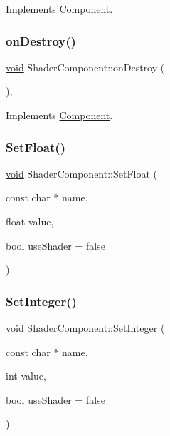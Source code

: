 Implements \hyperlink{classComponent_a3a1537a8b8bcdb2155afbb925c77b0a2}{Component}.

\mbox{\label{classShaderComponent_a7ebd7c8ee1b2aea5ad2010a4652bb588}} 
\subsubsection{\texorpdfstring{on\+Destroy()}{onDestroy()}}
{\footnotesize\ttfamily \hyperlink{imgui__impl__opengl3__loader_8h_ac668e7cffd9e2e9cfee428b9b2f34fa7}{void} Shader\+Component\+::on\+Destroy (\begin{DoxyParamCaption}{ }\end{DoxyParamCaption})\hspace{0.3cm}{\ttfamily [inline]}, {\ttfamily [virtual]}}



Implements \hyperlink{classComponent_a2b198f27162a6caf63917e304295f892}{Component}.

\mbox{\label{classShaderComponent_a043aa71f2b2efc6718f587d22a9b6d8c}} 
\subsubsection{\texorpdfstring{Set\+Float()}{SetFloat()}}
{\footnotesize\ttfamily \hyperlink{imgui__impl__opengl3__loader_8h_ac668e7cffd9e2e9cfee428b9b2f34fa7}{void} Shader\+Component\+::\+Set\+Float (\begin{DoxyParamCaption}\item[{const char $\ast$}]{name,  }\item[{float}]{value,  }\item[{bool}]{use\+Shader = {\ttfamily false} }\end{DoxyParamCaption})}

\mbox{\label{classShaderComponent_a23f051529e36aeb7ccddaf4ff543cebc}} 
\subsubsection{\texorpdfstring{Set\+Integer()}{SetInteger()}}
{\footnotesize\ttfamily \hyperlink{imgui__impl__opengl3__loader_8h_ac668e7cffd9e2e9cfee428b9b2f34fa7}{void} Shader\+Component\+::\+Set\+Integer (\begin{DoxyParamCaption}\item[{const char $\ast$}]{name,  }\item[{int}]{value,  }\item[{bool}]{use\+Shader = {\ttfamily false} }\end{DoxyParamCaption})}

